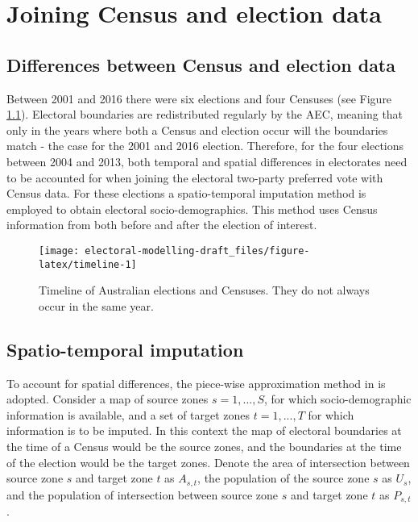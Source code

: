 \documentclass[openany]{book}
\begin{document}
\hypertarget{imputation}{%
\chapter{Joining Census and election data}\label{imputation}}

\hypertarget{differences-between-census-and-election-data}{%
\section{Differences between Census and election data}\label{differences-between-census-and-election-data}}

Between 2001 and 2016 there were six elections and four Censuses (see Figure \ref{fig:timeline}). Electoral boundaries are redistributed regularly by the AEC, meaning that only in the years where both a Census and election occur will the boundaries match - the case for the 2001 and 2016 election. Therefore, for the four elections between 2004 and 2013, both temporal and spatial differences in electorates need to be accounted for when joining the electoral two-party preferred vote with Census data. For these elections a spatio-temporal imputation method is employed to obtain electoral socio-demographics. This method uses Census information from both before and after the election of interest.

\begin{figure}[h]

{\centering \texttt{[image: electoral-modelling-draft\_files/figure-latex/timeline-1]} 

}

\caption{Timeline of Australian elections and Censuses. They do not always occur in the same year.}\label{fig:timeline}
\end{figure}

\hypertarget{spatio-temporal-imputation}{%
\section{Spatio-temporal imputation}\label{spatio-temporal-imputation}}

To account for spatial differences, the piece-wise approximation method in \citet{Goodchild1993} is adopted. Consider a map of source zones \(s = 1,...,S\), for which socio-demographic information is available, and a set of target zones \(t = 1,...,T\) for which information is to be imputed. In this context the map of electoral boundaries at the time of a Census would be the source zones, and the boundaries at the time of the election would be the target zones. Denote the area of intersection between source zone \(s\) and target zone \(t\) as \(A_{s,t}\), the population of the source zone \(s\) as \(U_s\), and the population of intersection between source zone \(s\) and target zone \(t\) as \(P_{s,t}\).
\end{document}
